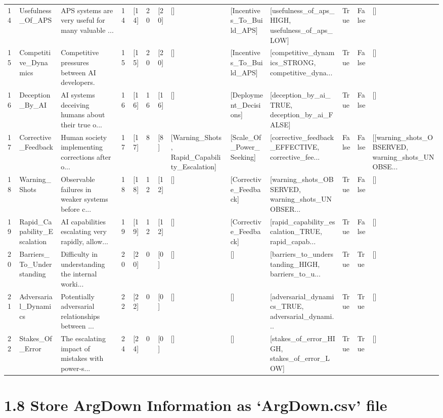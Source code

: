 \documentclass[
  11pt,
  letterpaper,
]{book}
\begin{document}
\begin{longtable}[]{@{}lllllllllllll@{}}
14 & Usefulness\_Of\_APS & APS systems are very useful for many valuable
... & 14 & {[}14{]} & 20 & {[}20{]} & {[}{]} &
{[}Incentives\_To\_Build\_APS{]} & {[}usefulness\_of\_aps\_HIGH,
usefulness\_of\_aps\_LOW{]} & True & False & {[}{]} \\
15 & Competitive\_Dynamics & Competitive pressures between AI
developers. & 15 & {[}15{]} & 20 & {[}20{]} & {[}{]} &
{[}Incentives\_To\_Build\_APS{]} & {[}competitive\_dynamics\_STRONG,
competitive\_dyna... & True & False & {[}{]} \\
16 & Deception\_By\_AI & AI systems deceiving humans about their true
o... & 16 & {[}16{]} & 16 & {[}16{]} & {[}{]} &
{[}Deployment\_Decisions{]} & {[}deception\_by\_ai\_TRUE,
deception\_by\_ai\_FALSE{]} & True & False & {[}{]} \\
17 & Corrective\_Feedback & Human society implementing corrections after
o... & 17 & {[}17{]} & 8 & {[}8{]} & {[}Warning\_Shots,
Rapid\_Capability\_Escalation{]} & {[}Scale\_Of\_Power\_Seeking{]} &
{[}corrective\_feedback\_EFFECTIVE, corrective\_fee... & False & False &
{[}{[}warning\_shots\_OBSERVED, warning\_shots\_UNOBSE... \\
18 & Warning\_Shots & Observable failures in weaker systems before c...
& 18 & {[}18{]} & 12 & {[}12{]} & {[}{]} & {[}Corrective\_Feedback{]} &
{[}warning\_shots\_OBSERVED, warning\_shots\_UNOBSER... & True & False &
{[}{]} \\
19 & Rapid\_Capability\_Escalation & AI capabilities escalating very
rapidly, allow... & 19 & {[}19{]} & 12 & {[}12{]} & {[}{]} &
{[}Corrective\_Feedback{]} & {[}rapid\_capability\_escalation\_TRUE,
rapid\_capab... & True & False & {[}{]} \\
20 & Barriers\_To\_Understanding & Difficulty in understanding the
internal worki... & 20 & {[}20{]} & 0 & {[}0{]} & {[}{]} & {[}{]} &
{[}barriers\_to\_understanding\_HIGH, barriers\_to\_u... & True & True &
{[}{]} \\
21 & Adversarial\_Dynamics & Potentially adversarial relationships
between ... & 22 & {[}22{]} & 0 & {[}0{]} & {[}{]} & {[}{]} &
{[}adversarial\_dynamics\_TRUE, adversarial\_dynami... & True & True &
{[}{]} \\
22 & Stakes\_Of\_Error & The escalating impact of mistakes with
power-s... & 24 & {[}24{]} & 0 & {[}0{]} & {[}{]} & {[}{]} &
{[}stakes\_of\_error\_HIGH, stakes\_of\_error\_LOW{]} & True & True &
{[}{]} \\
\end{longtable}

\section{1.8 Store ArgDown Information as `ArgDown.csv'
file}\label{store-argdown-information-as-argdown.csv-file}
\end{document}
